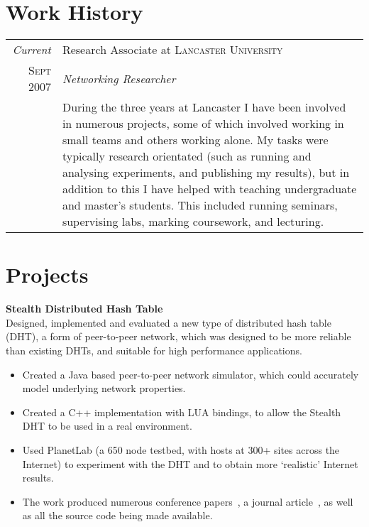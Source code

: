 \documentclass[a4paper,10pt]{article}
\begin{document}
\section{Work History}
\begin{tabular}{r|p{13.5cm}}
 \emph{Current} & Research Associate at \textsc{Lancaster University} \\
 \textsc{Sept 2007} & \emph{Networking Researcher}\\
& During the three years at Lancaster I have been involved in numerous projects, some of which involved working in small teams and others working alone. My tasks were typically research orientated (such as running and analysing experiments, and publishing my results), but in addition to this I have helped with teaching undergraduate and master's students. This included running seminars, supervising labs, marking coursework, and lecturing.\\


\end{tabular}

\nocite{jakeman2009fna,faulkner2009epn,macquire2008acf,brampton2008cew,macquire2008asd,brampton2007cui,rai2007pmp,brampton2006sdh,macquire2006asd,macquire2006pas,brampton2005sdh}

\section{Projects}
 \textbf{Stealth Distributed Hash Table}\\
 Designed, implemented and evaluated a new type of distributed hash table (DHT), a form of peer-to-peer network, which was designed to be more reliable than existing DHTs, and suitable for high performance applications.

 \begin{itemize}
  \item Created a Java based peer-to-peer network simulator, which could accurately model underlying network properties.
  \item Created a C++ implementation with LUA bindings, to allow the Stealth DHT to be used in a real environment.
  \item Used PlanetLab (a 650 node testbed, with hosts at 300+ sites across the Internet) to experiment with the DHT and to obtain more `realistic' Internet results.
  \item The work produced numerous conference papers~\cite{rai2007pmp, brampton2006sdh, macquire2006asd, macquire2006pas,  brampton2005sdh}, a journal article~\cite{macquire2008asd}, as well as all the source code being made available.
 \end{itemize}
\vspace{1em}
\end{document}
